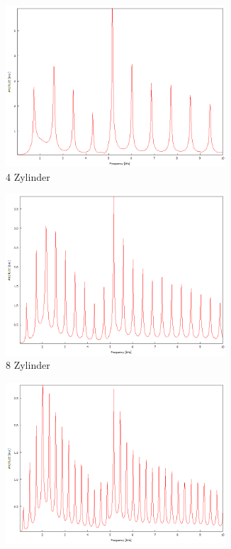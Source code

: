 \begin{figure}
  \centering
  \begin{subfigure}{0.32\textwidth}
    \centering
    \includegraphics[width=0.9\textwidth]{Bilder/PC_Zylindermessung/4_Zylinder.png}
    \caption{4 Zylinder}
  \end{subfigure}
  \begin{subfigure}{0.32\textwidth}
    \centering
    \includegraphics[width=0.9\textwidth]{Bilder/PC_Zylindermessung/8_Zylinder.png}
    \caption{8 Zylinder}
  \end{subfigure}
  \begin{subfigure}{0.32\textwidth}
    \centering
    \includegraphics[width=0.9\textwidth]{Bilder/PC_Zylindermessung/12_Zylinder.png}

\end{subfigure}
\end{figure}
